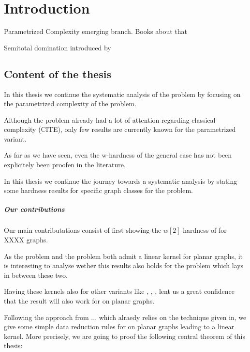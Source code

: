 \chapter{Introduction}

Parametrized Complexity emerging branch. Books about that

Semitotal domination introduced by 
\section{Content of the thesis}

In this thesis we continue the systematic analysis of the \sdom problem by focusing on the parametrized complexity of the problem. 

Although the problem already had a lot of attention regarding classical complexity (CITE), only few results are currently known for the parametrized variant. 

As far as we have seen, even the w-hardness of the general case has not been explicitely been proofen in the literature. 

In this thesis we continue the journey towards a systematic analysis by stating some hardness results for specific graph classes for the problem.

\paragraph{Our contributions}

Our main contributations consist of first showing the $w[2]$-hardness of \sdom for XXXX graphs.

\noindent As the \dom problem and the \tdom problem both admit a linear kernel for planar graphs, it is interesting to analyse wether this results also holds for the \sdom problem which lays in between these two. 

Having these kernels also for other variants like \eddom, \efdom, \cdom, \rbdom lent us a great confidence that the result will also work for \sdom on planar graphs.


Following the approach from ... which alraedy relies on the technique given in, we give some simple data reduction rules for \sdom on planar graphs leading to a linear kernel. More precisely, we are going to proof the following central theorem of this thesis:

